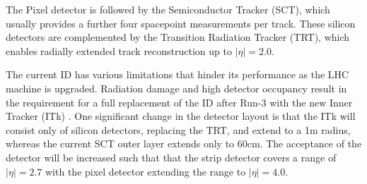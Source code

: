 The Pixel detector is followed by the Semiconductor Tracker (SCT), which usually provides a further four spacepoint measurements per track. These silicon detectors are complemented by the Transition Radiation Tracker (TRT), which enables radially extended track reconstruction up to $ \lvert \eta \rvert = 2.0$.

The current ID has various limitations that hinder its performance as the \ac{LHC} machine is upgraded. Radiation damage and high detector occupancy result in the requirement for a full replacement of the ID after Run-3 with the new Inner Tracker (ITk) \cite{pileup,itk-strip}. One significant change in the detector layout is that the ITk will consist only of silicon detectors, replacing the TRT, and extend to a 1m radius, whereas the current SCT outer layer extends only to 60cm. The acceptance of the detector will be increased such that that the strip detector covers a range of $ \lvert \eta \rvert = 2.7$ with the pixel detector extending the range to $ \lvert \eta \rvert = 4.0$.



